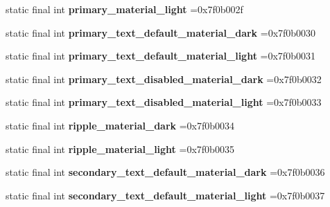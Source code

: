 \begin{DoxyCompactItemize}
static final int {\bfseries primary\+\_\+material\+\_\+light} =0x7f0b002f
\item 
\mbox{\label{classproject4_1_1xaria_1_1R_1_1color_adfde66a261feb283d310fe53542f4da0}} 
static final int {\bfseries primary\+\_\+text\+\_\+default\+\_\+material\+\_\+dark} =0x7f0b0030
\item 
\mbox{\label{classproject4_1_1xaria_1_1R_1_1color_a14d6c8ed55bd8e617898d6e32ae38a4a}} 
static final int {\bfseries primary\+\_\+text\+\_\+default\+\_\+material\+\_\+light} =0x7f0b0031
\item 
\mbox{\label{classproject4_1_1xaria_1_1R_1_1color_adeab3d402e0b0e83d1ef0ed59aa7967c}} 
static final int {\bfseries primary\+\_\+text\+\_\+disabled\+\_\+material\+\_\+dark} =0x7f0b0032
\item 
\mbox{\label{classproject4_1_1xaria_1_1R_1_1color_a33ab41be465b5a0c15ea3a80db7da963}} 
static final int {\bfseries primary\+\_\+text\+\_\+disabled\+\_\+material\+\_\+light} =0x7f0b0033
\item 
\mbox{\label{classproject4_1_1xaria_1_1R_1_1color_a4f07137bfedcc470f4498b39515c9aa3}} 
static final int {\bfseries ripple\+\_\+material\+\_\+dark} =0x7f0b0034
\item 
\mbox{\label{classproject4_1_1xaria_1_1R_1_1color_aabcb01b72abfac9d90cd3c7ba8752e1c}} 
static final int {\bfseries ripple\+\_\+material\+\_\+light} =0x7f0b0035
\item 
\mbox{\label{classproject4_1_1xaria_1_1R_1_1color_a39aa87861b45427a2ad52dc331844f53}} 
static final int {\bfseries secondary\+\_\+text\+\_\+default\+\_\+material\+\_\+dark} =0x7f0b0036
\item 
\mbox{\label{classproject4_1_1xaria_1_1R_1_1color_af440af4c9aa9c97fbfc9bde0f94d5d48}} 
static final int {\bfseries secondary\+\_\+text\+\_\+default\+\_\+material\+\_\+light} =0x7f0b0037
\item 
\mbox{\label{classproject4_1_1xaria_1_1R_1_1color_a4165cb2353ac3f4537c3ebdfb521c88d}} 

\end{DoxyCompactItemize}
